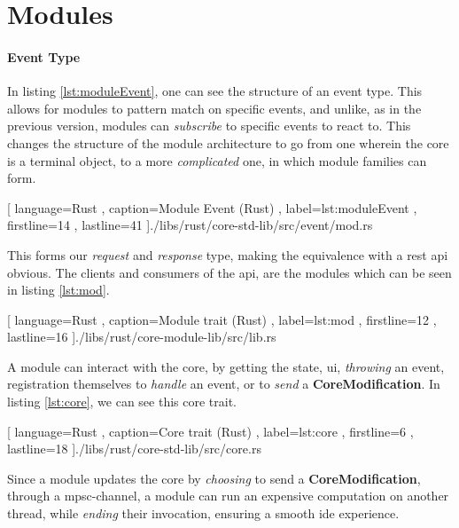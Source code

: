 \section{Modules}

\paragraph{Event Type} In listing \ref{lst:moduleEvent}, one can see the
structure of an event type. This allows for modules to pattern match on specific
events, and unlike, as in the previous version, modules can \textit{subscribe}
to specific events to react to. This changes the structure of the module
architecture to go from one wherein the core is a terminal object, to a more
\textit{complicated} one, in which module families can form.

\begin{center}
  
    [ language=Rust
    , caption={Module Event (Rust)}
    , label=lst:moduleEvent
    , firstline=14
    , lastline=41
    ]{./libs/rust/core-std-lib/src/event/mod.rs}
\end{center}

This forms our \textit{request} and \textit{response} type, making the
equivalence with a \gls*{rest} \gls*{api} obvious. The clients and consumers
of the \gls*{api}, are the modules which can be seen in listing \ref{lst:mod}.

\begin{center}
  
    [ language=Rust
    , caption={Module trait (Rust)}
    , label=lst:mod
    , firstline=12
    , lastline=16
    ]{./libs/rust/core-module-lib/src/lib.rs}
\end{center}

A module can interact with the core, by getting the state, \gls*{ui},
\textit{throwing} an event, registration themselves to \textit{handle} an
event, or to \textit{send} a \textbf{CoreModification}. In listing
\ref{lst:core}, we can see this core trait.

\begin{center}
  
    [ language=Rust
    , caption={Core trait (Rust)}
    , label=lst:core
    , firstline=6
    , lastline=18
    ]{./libs/rust/core-std-lib/src/core.rs}
\end{center}

Since a module updates the core by \textit{choosing} to send a
\textbf{CoreModification}, through a \gls*{mpsc}-channel, a module can run an
expensive computation on another thread, while \textit{ending} their
invocation, ensuring a smooth \gls*{ide} experience.


